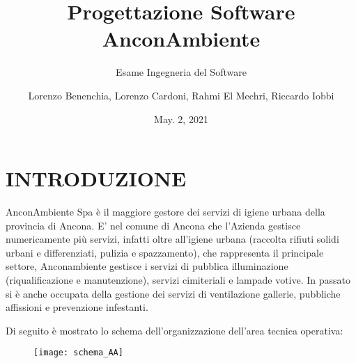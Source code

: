\documentclass[green, fancy, 11pt]{elegantbook}
\title{Progettazione Software AnconAmbiente}
\subtitle{Esame Ingegneria del Software}
\author{Lorenzo Benenchia, Lorenzo Cardoni, Rahmi El Mechri, Riccardo Iobbi}
\institute{UNIVPM}
\date{May. 2, 2021}
\begin{document}
\maketitle
\frontmatter
\tableofcontents
\mainmatter

\chapter{INTRODUZIONE}
\noindent AnconAmbiente Spa è il maggiore gestore dei servizi di igiene urbana della provincia di Ancona.
\noindent E’ nel comune di Ancona che l’Azienda gestisce numericamente più servizi, infatti oltre all’igiene urbana (raccolta rifiuti solidi urbani e differenziati, pulizia e spazzamento), che rappresenta il principale settore, Anconambiente gestisce i servizi di pubblica illuminazione (riqualificazione e manutenzione), servizi cimiteriali e lampade votive. In passato si è anche occupata della gestione dei servizi di ventilazione gallerie, 
pubbliche affissioni e prevenzione infestanti.

\noindent Di seguito è mostrato lo schema dell'organizzazione dell'area tecnica operativa:\\

\begin{figure}
	\texttt{[image: schema\_AA]}\\
\end{figure}
\newpage
\end{document}
